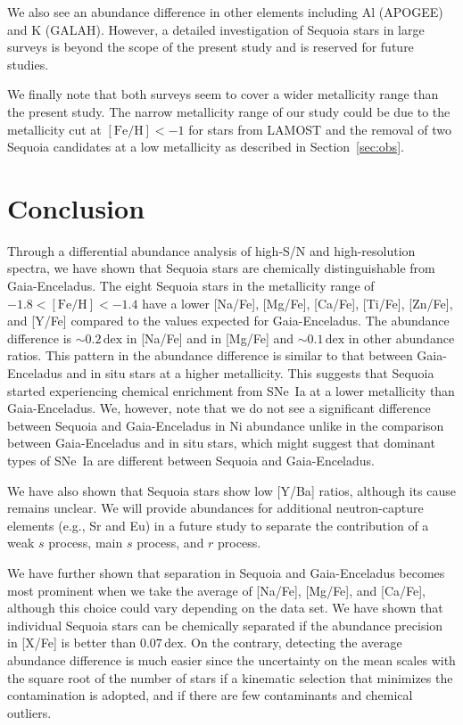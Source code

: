 \documentclass{aa}
\begin{document}
We also see an abundance difference in other elements including Al (APOGEE) and K (GALAH).
However, a detailed investigation of Sequoia stars in large surveys is beyond the scope of the present study and is reserved for future studies. 

We finally note that both surveys seem to cover a wider metallicity range than the present study. 
The narrow metallicity range of our study could be due to the metallicity cut at $[\mathrm{Fe/H}]<-1$ for stars from LAMOST and the removal of two Sequoia candidates at a low metallicity as described in Section~\ref{sec:obs}.

\section{Conclusion\label{sec:conclusion}}

Through a differential abundance analysis of high-S/N and high-resolution spectra, we have shown that Sequoia stars are chemically distinguishable from Gaia-Enceladus.
The eight Sequoia stars in the metallicity range of $-1.8<[\mathrm{Fe/H}]<-1.4$ have a lower [{Na}/{Fe}], [{Mg}/{Fe}], [{Ca}/{Fe}], [{Ti}/{Fe}], [{Zn}/{Fe}], and [{Y}/{Fe}] compared to the values expected for Gaia-Enceladus. 
The abundance difference is $\sim 0.2\,\mathrm{dex}$ in [{Na}/{Fe}] and in [{Mg}/{Fe}] and $\sim 0.1\,\mathrm{dex}$ in other abundance ratios. 
This pattern in the abundance difference is similar to that between Gaia-Enceladus and in situ stars at a higher metallicity.
This suggests that Sequoia started experiencing chemical enrichment from SNe~Ia at a lower metallicity than Gaia-Enceladus.
We, however, note that we do not see a significant difference between Sequoia and Gaia-Enceladus in Ni abundance unlike in the comparison between Gaia-Enceladus and in situ stars, which might suggest that dominant types of SNe~Ia are different between Sequoia and Gaia-Enceladus.

We have also shown that Sequoia stars show low [{Y}/{Ba}] ratios, although its cause remains unclear.
We will provide abundances for additional neutron-capture elements (e.g., Sr and Eu) in a future study to separate the contribution of a weak $s$ process, main $s$ process, and $r$ process.  

We have further shown that separation in Sequoia and Gaia-Enceladus becomes most prominent when we take the average of [{Na}/{Fe}], [{Mg}/{Fe}], and [{Ca}/{Fe}], although this choice could vary depending on the data set.
We have shown that individual Sequoia stars can be chemically separated if the abundance precision in [{X}/{Fe}] is better than $0.07\,\mathrm{dex}$.
On the contrary, detecting the average abundance difference is much easier since the uncertainty on the mean scales with the square root of the number of stars if a kinematic selection that minimizes the contamination is adopted, and if there are few contaminants and chemical outliers.
\end{document}
